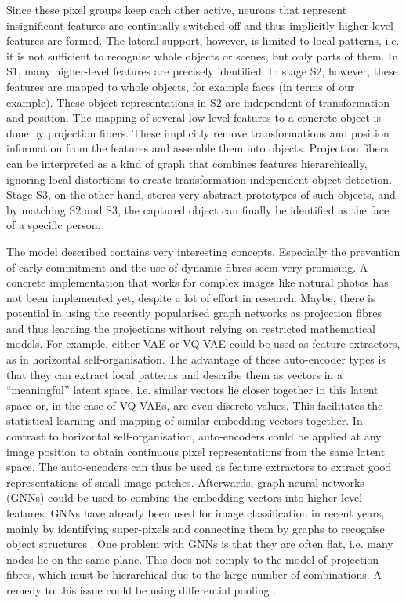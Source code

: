Since these pixel groups keep each other active, neurons that represent insignificant features are continually switched off and thus implicitly higher-level features are formed. The lateral support, however, is limited to local patterns, i.e. it is not sufficient to recognise whole objects or scenes, but only parts of them. In S$1$, many higher-level features are precisely identified. In stage S$2$, however, these features are mapped to whole objects, for example faces (in terms of our example). These object representations in S$2$ are independent of transformation and position. The mapping of several low-level features to a concrete object is done by projection fibers. These implicitly remove transformations and position information from the features and assemble them into objects. Projection fibers can be interpreted as a kind of graph that combines features hierarchically, ignoring local distortions to create transformation independent object detection. Stage S$3$, on the other hand, stores very abstract prototypes of such objects, and by matching S$2$ and S$3$, the captured object can finally be identified as the face of a specific person.

The model described contains very interesting concepts. Especially the prevention of early commitment and the use of dynamic fibres seem very promising. A concrete implementation that works for complex images like natural photos has not been implemented yet, despite a lot of effort in research. Maybe,  there is potential in using the recently popularised graph networks as projection fibres and thus learning the projections without relying on restricted mathematical models. For example, either VAE or VQ-VAE could be used as feature extractors, as in horizontal self-organisation. The advantage of these auto-encoder types is that they can extract local patterns and describe them as vectors in a ``meaningful'' latent space, i.e. similar vectors lie closer together in this latent space or, in the case of VQ-VAEs, are even discrete values. This facilitates the statistical learning and mapping of similar embedding vectors together. In contrast to horizontal self-organisation, auto-encoders could be applied at any image position to obtain continuous pixel representations from the same latent space. The auto-encoders can thus be used as feature extractors to extract good representations of small image patches. Afterwards, graph neural networks (GNNs) could be used to combine the embedding vectors into higher-level features. GNNs have already been used for image classification in recent years, mainly by identifying super-pixels and connecting them by graphs to recognise object structures .  One problem with GNNs is that they are often flat, i.e. many nodes lie on the same plane. This does not comply to the model of projection fibres, which must be hierarchical due to the large number of combinations. A remedy to this issue could be using differential pooling .

